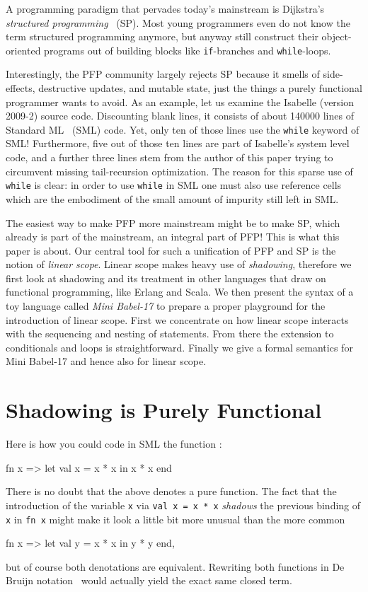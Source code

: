 \documentclass{llncs}
\newcommand{\bsrc}[1] {\lstinline!#1!}
\begin{document}
A programming paradigm that pervades today's mainstream is Dijkstra's \emph{structured programming}~\cite{structuredprogramming} (SP). Most young programmers even do not know the term structured programming anymore, but anyway still construct their object-oriented programs out of building blocks like \bsrc{if}-branches and \bsrc{while}-loops.

Interestingly, the PFP community largely rejects SP because it smells of side-effects, destructive updates, and mutable state, just the things a purely functional programmer wants to avoid. As an example, let us examine the Isabelle (version 2009-2) source code.
Discounting blank lines,  it consists of about 140000 lines of Standard ML~\cite{standardml} (SML) code. Yet, only ten of those lines use the \bsrc{while} keyword of SML! Furthermore, five out of those ten lines are part of Isabelle's system level code, and a further three lines stem from the author of this paper trying to circumvent missing tail-recursion optimization. The reason for this sparse use of \bsrc{while} is clear: in order to use \bsrc{while} in SML one must also use reference cells which are the embodiment of the small amount of impurity still left in SML. 

The easiest way to make PFP more mainstream might be to make SP, which already is part of the mainstream, an integral part of PFP! This is what this paper is about. Our central tool for such a unification of PFP and SP is the notion of \emph{linear scope}. Linear scope makes heavy use of \emph{shadowing}, therefore we first look at shadowing and its treatment in other languages that draw on functional programming, like Erlang and Scala. We then present the syntax of a toy language called  \emph{Mini Babel-17} to prepare a proper playground for the introduction of linear scope. First we concentrate on how linear scope interacts with the sequencing and nesting of statements. From there the extension to conditionals and loops is straightforward.
Finally we give a formal semantics for Mini Babel-17 and hence also for linear scope.

\section{Shadowing is Purely Functional}\label{sec:shadowing}
Here is how you could code in SML the function :
\begin{babellisting}
fn x => let val x = x * x in x * x end
\end{babellisting}
There is no doubt that the above denotes a pure function. The fact that the introduction of the variable \bsrc{x} via \bsrc{val x = x * x} \emph{shadows} the previous binding of \bsrc{x} in \bsrc{fn x} might make it look a little bit more unusual than the more common 
\begin{babellisting}
fn x => let val y = x * x in y * y end,
\end{babellisting}
but of course both denotations are equivalent. Rewriting both functions in De Bruijn notation~\cite{debruijn} would actually yield the exact same closed term.
\end{document}
